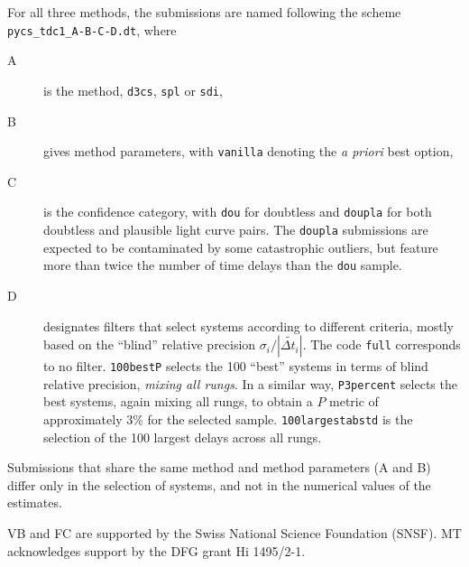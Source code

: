 \documentclass[traditabstract]{aa}
\begin{document}
For all three methods, the submissions are named following the
scheme {\tt pycs\_tdc1\_A-B-C-D.dt}, where
\begin{description}
\item[A] is the method, {\tt d3cs}, {\tt spl} or {\tt sdi},
\item[B] gives method parameters, with {\tt vanilla} denoting the \emph{a priori} best option,
\item[C] is the confidence category, with {\tt dou} for doubtless and {\tt doupla} for both doubtless and plausible light curve pairs. The {\tt doupla} submissions are expected to be contaminated by some catastrophic outliers, but feature more than twice the number of time delays than the {\tt dou} sample.
\item[D] designates filters that select systems according to different criteria, mostly based on the
``blind'' relative precision $\sigma_i / |\widetilde{\Delta t_i}|$. The code {\tt full} corresponds to no filter. {\tt 100bestP} selects the 100 ``best'' systems in terms of blind relative precision, \emph{mixing all rungs}. In a similar way, {\tt P3percent} selects the best systems, again mixing all rungs, to obtain a $P$ metric of approximately 3\% for the selected sample. {\tt 100largestabstd} is the selection of the 100 largest delays across all rungs.
\end{description}
Submissions that share the same method and method parameters (A and B) differ only in the selection of systems, and not in the numerical values of the estimates.









\begin{acknowledgements}
VB and FC are supported by the Swiss National Science Foundation (SNSF). MT acknowledges support by the DFG grant Hi 1495/2-1.
\end{acknowledgements}





\end{document}
